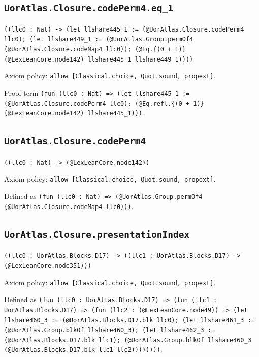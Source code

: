 \documentclass[11pt]{article}
\begin{document}
\subsection*{\texttt{UorAtlas.Closure.codePerm4.eq\_1}}
\noindent\texttt{((llc0 : Nat) -> (let llshare445\_1 := (@UorAtlas.Closure.codePerm4 llc0); (let llshare449\_1 := (@UorAtlas.Group.permOf4 (@UorAtlas.Closure.codeMap4 llc0)); (@Eq.\{(0 + 1)\} (@LexLeanCore.node142) llshare445\_1 llshare449\_1))))}\par
\noindent Axiom policy: \texttt{allow [Classical.choice, Quot.sound, propext]}.\par
\noindent Proof term \texttt{(fun (llc0 : Nat) => (let llshare445\_1 := (@UorAtlas.Closure.codePerm4 llc0); (@Eq.refl.\{(0 + 1)\} (@LexLeanCore.node142) llshare445\_1)))}.\par
\subsection*{\texttt{UorAtlas.Closure.codePerm4}}
\noindent\texttt{((llc0 : Nat) -> (@LexLeanCore.node142))}\par
\noindent Axiom policy: \texttt{allow [Classical.choice, Quot.sound, propext]}.\par
\noindent Defined as \texttt{(fun (llc0 : Nat) => (@UorAtlas.Group.permOf4 (@UorAtlas.Closure.codeMap4 llc0)))}.\par
\subsection*{\texttt{UorAtlas.Closure.presentationIndex}}
\noindent\texttt{((llc0 : UorAtlas.Blocks.D17) -> ((llc1 : UorAtlas.Blocks.D17) -> (@LexLeanCore.node351)))}\par
\noindent Axiom policy: \texttt{allow [Classical.choice, Quot.sound, propext]}.\par
\noindent Defined as \texttt{(fun (llc0 : UorAtlas.Blocks.D17) => (fun (llc1 : UorAtlas.Blocks.D17) => (fun (llc2 : (@LexLeanCore.node49)) => (let llshare460\_3 := (@UorAtlas.Blocks.D17.blk llc0); (let llshare461\_3 := (@UorAtlas.Group.blkOf llshare460\_3); (let llshare462\_3 := (@UorAtlas.Blocks.D17.blk llc1); (@UorAtlas.Group.blkOf llshare460\_3 (@UorAtlas.Blocks.D17.blk llc1 llc2))))))))}.\par
\end{document}
